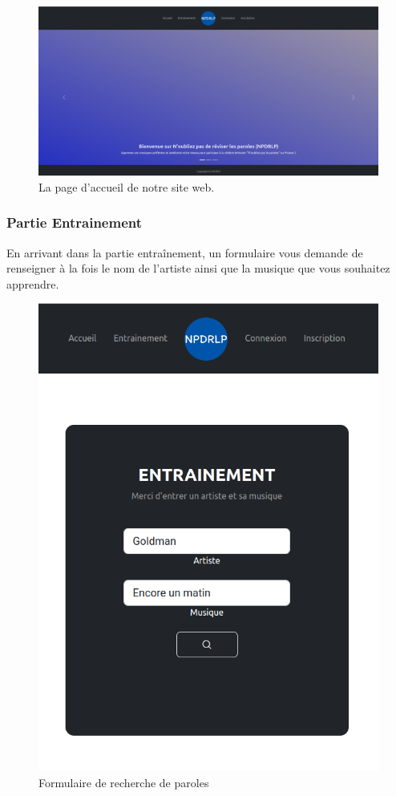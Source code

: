 \documentclass[12pt,french]{article}
\begin{document}
\begin{figure}[H]
	\centering
	\includegraphics[scale=0.25]{accueil.png}
	\caption{La page d'accueil de notre site web.}
\end{figure}


\subsubsection{Partie Entrainement}

En arrivant dans la partie entraînement, un formulaire vous demande de renseigner à la fois le nom de l'artiste ainsi que la musique que vous souhaitez apprendre.

\begin{figure}[H]
	\centering
	\includegraphics[scale=0.25]{rechercheparole.png}
	\caption{Formulaire de recherche de paroles}
\end{figure}
\end{document}

